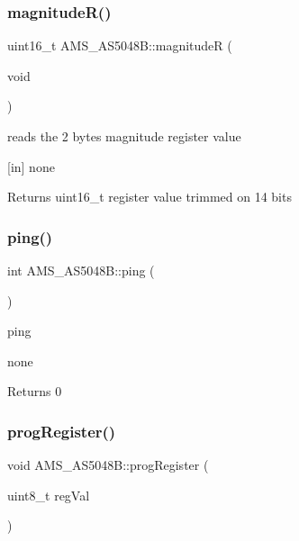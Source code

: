 \subsubsection{\texorpdfstring{magnitude\+R()}{magnitudeR()}}
{\footnotesize\ttfamily uint16\+\_\+t A\+M\+S\+\_\+\+A\+S5048\+B\+::magnitudeR (\begin{DoxyParamCaption}\item[{void}]{ }\end{DoxyParamCaption})}



reads the 2 bytes magnitude register value 

\mbox{[}in\mbox{]} none \begin{DoxyReturn}{Returns}
uint16\+\_\+t register value trimmed on 14 bits 
\end{DoxyReturn}
\mbox{\label{classAMS__AS5048B_a7c80b5daeb18595c1a0e7b5a9d44b4e8}} 
\subsubsection{\texorpdfstring{ping()}{ping()}}
{\footnotesize\ttfamily int A\+M\+S\+\_\+\+A\+S5048\+B\+::ping (\begin{DoxyParamCaption}{ }\end{DoxyParamCaption})}



ping 

none \begin{DoxyReturn}{Returns}
0 
\end{DoxyReturn}
\mbox{\label{classAMS__AS5048B_a6ff8070d7845ce5ef325a6c64ea29c96}} 
\subsubsection{\texorpdfstring{prog\+Register()}{progRegister()}}
{\footnotesize\ttfamily void A\+M\+S\+\_\+\+A\+S5048\+B\+::prog\+Register (\begin{DoxyParamCaption}\item[{uint8\+\_\+t}]{reg\+Val }\end{DoxyParamCaption})}




